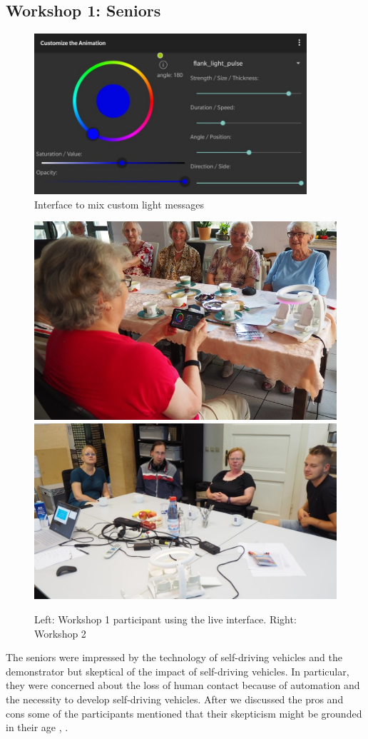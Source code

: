\subsection{Workshop 1: Seniors}
\begin{figure}
    \includegraphics[width=0.9\textwidth]{fig/customAniShrunk.jpg}
    \caption[Light mixing interface]{Interface to mix custom light messages}
    \label{fig:liveinterface}
\end{figure}
\begin{figure}
    \includegraphics[height=0.3\textwidth]{fig/omis.jpg}\hfill\includegraphics[height=0.3\textwidth]{fig/workshop2.JPG}
    \caption[Workshop]{Left: Workshop 1 participant using the live interface. Right: Workshop 2}
    \label{fig:workshop}
\end{figure}
The seniors were impressed by the technology of self-driving vehicles and the demonstrator but skeptical of the impact of self-driving vehicles. In particular, they were concerned about the loss of human contact because of automation and the necessity to develop self-driving vehicles. After we discussed the pros and cons some of the participants mentioned that their skepticism might be grounded in their age , . 
